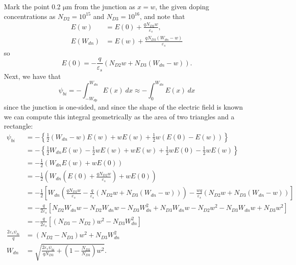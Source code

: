 \documentclass{article}
\begin{document}
Mark the point 0.2 $\mathrm{\mu m}$ from the junction as $x = w$, the given 
doping concentrations as $N_{D2} = 10^{15}$ and $N_{D3} = 10^{16}$, and note that
\begin{align*}
E(w)      &= E(0) + \frac{q N_{D2} w}{\varepsilon_s}, \\
E(W_{dn}) &= E(w) + \frac{q N_{D3} (W_{dn} - w)}{\varepsilon_s}
\end{align*}
so
$$
E(0) = -\frac{q}{\varepsilon_s}(N_{D2} w + N_{D3} (W_{dn} - w)).
$$
Next, we have that
$$
\psi_{bi} = -\int_{-W_{dp}}^{W_{dn}} E(x) ~dx 
          \approx -\int_{0}^{W_{dn}} E(x) ~dx
$$
since the junction is one-sided, and since the shape of the electric field is
known we can compute this integral geometrically as the area of two triangles
and a rectangle:
\begin{align*}
\psi_{bi} &= -\left\{\frac{1}{2}(W_{dn} - w)E(w) 
                  + w E(w) 
                  + \frac{1}{2} w (E(0) - E(w))\right\} \\
          &= -\left\{\frac{1}{2} W_{dn} E(w) 
                  - \frac{1}{2} w E(w) 
                  + w E(w) 
                  + \frac{1}{2} w E(0)
                  - \frac{1}{2} w E(w)\right\} \\
          &= -\frac{1}{2}(W_{dn} E(w) + w E(0)) \\
          &= -\frac{1}{2}(W_{dn} \left(E(0) + 
                                  \frac{qN_{D2} w}{\varepsilon_s}\right) + w E(0)) \\
          &= -\frac{1}{2}\left[W_{dn}\left(\frac{q N_{D2} w}{\varepsilon_s}
                             - \frac{q}{\varepsilon_s}(N_{D2} w + N_{D3}(W_{dn} - w))\right)
                             - \frac{w q}{\varepsilon_s}(N_{D2} w + N_{D3}(W_{dn} - w))\right] \\
          &= -\frac{q}{2\varepsilon_s}\left[N_{D2} W_{dn} w
                                          - N_{D2} W_{dn} w
                                          - N_{D3} W_{dn}^2
                                          + N_{D3} W_{dn} w
                                          - N_{D2} w^2 
                                          - N_{D3} W_{dn} w
                                          + N_{D3} w^2\right] \\
          &= -\frac{q}{2\varepsilon_s}\left[(N_{D3} - N_{D2}) w^2 - N_{D3} W_{dn}^2\right] \\
\frac{2 \varepsilon_s \psi_{bi}}{q} &= (N_{D2} - N_{D3}) w^2 + N_{D3} W_{dn}^2 \\
W_{dn} &= \sqrt{\frac{2 \varepsilon_s \psi_{bi}}{q N_{D3}} 
                + \left(1 - \frac{N_{D2}}{N_{D3}}\right) w^2}. \\
\end{align*}
\end{document}

